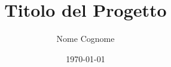 \documentclass{article}
\begin{document}
\title{Titolo del Progetto}
\author{Nome Cognome}
\date{\today}
\maketitle

\tableofcontents

    

    

    
    
\end{document}

